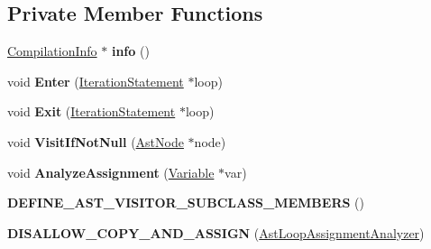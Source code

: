 \subsection*{Private Member Functions}
\begin{DoxyCompactItemize}
\item 
\hyperlink{classv8_1_1internal_1_1_compilation_info}{Compilation\+Info} $\ast$ {\bfseries info} ()\hypertarget{classv8_1_1internal_1_1compiler_1_1_ast_loop_assignment_analyzer_a5e7b098b4dede01ea4f315dddbf69f07}{}\label{classv8_1_1internal_1_1compiler_1_1_ast_loop_assignment_analyzer_a5e7b098b4dede01ea4f315dddbf69f07}

\item 
void {\bfseries Enter} (\hyperlink{classv8_1_1internal_1_1_iteration_statement}{Iteration\+Statement} $\ast$loop)\hypertarget{classv8_1_1internal_1_1compiler_1_1_ast_loop_assignment_analyzer_a2e0fc70c52ddba43ad5df95bf846c36d}{}\label{classv8_1_1internal_1_1compiler_1_1_ast_loop_assignment_analyzer_a2e0fc70c52ddba43ad5df95bf846c36d}

\item 
void {\bfseries Exit} (\hyperlink{classv8_1_1internal_1_1_iteration_statement}{Iteration\+Statement} $\ast$loop)\hypertarget{classv8_1_1internal_1_1compiler_1_1_ast_loop_assignment_analyzer_abe4a73265179590ee1ffda835e637954}{}\label{classv8_1_1internal_1_1compiler_1_1_ast_loop_assignment_analyzer_abe4a73265179590ee1ffda835e637954}

\item 
void {\bfseries Visit\+If\+Not\+Null} (\hyperlink{classv8_1_1internal_1_1_ast_node}{Ast\+Node} $\ast$node)\hypertarget{classv8_1_1internal_1_1compiler_1_1_ast_loop_assignment_analyzer_ac826382a25a131d5d9067b3f6353e669}{}\label{classv8_1_1internal_1_1compiler_1_1_ast_loop_assignment_analyzer_ac826382a25a131d5d9067b3f6353e669}

\item 
void {\bfseries Analyze\+Assignment} (\hyperlink{classv8_1_1internal_1_1_variable}{Variable} $\ast$var)\hypertarget{classv8_1_1internal_1_1compiler_1_1_ast_loop_assignment_analyzer_a9658c509693b8d834b611fa56361f8da}{}\label{classv8_1_1internal_1_1compiler_1_1_ast_loop_assignment_analyzer_a9658c509693b8d834b611fa56361f8da}

\item 
{\bfseries D\+E\+F\+I\+N\+E\+\_\+\+A\+S\+T\+\_\+\+V\+I\+S\+I\+T\+O\+R\+\_\+\+S\+U\+B\+C\+L\+A\+S\+S\+\_\+\+M\+E\+M\+B\+E\+RS} ()\hypertarget{classv8_1_1internal_1_1compiler_1_1_ast_loop_assignment_analyzer_a5ce3f5fe1b94f812966f227eba6ed986}{}\label{classv8_1_1internal_1_1compiler_1_1_ast_loop_assignment_analyzer_a5ce3f5fe1b94f812966f227eba6ed986}

\item 
{\bfseries D\+I\+S\+A\+L\+L\+O\+W\+\_\+\+C\+O\+P\+Y\+\_\+\+A\+N\+D\+\_\+\+A\+S\+S\+I\+GN} (\hyperlink{classv8_1_1internal_1_1compiler_1_1_ast_loop_assignment_analyzer}{Ast\+Loop\+Assignment\+Analyzer})\hypertarget{classv8_1_1internal_1_1compiler_1_1_ast_loop_assignment_analyzer_a6605b79f9896e8fbf7ea1f2f84476ad6}{}\label{classv8_1_1internal_1_1compiler_1_1_ast_loop_assignment_analyzer_a6605b79f9896e8fbf7ea1f2f84476ad6}

\end{DoxyCompactItemize}
